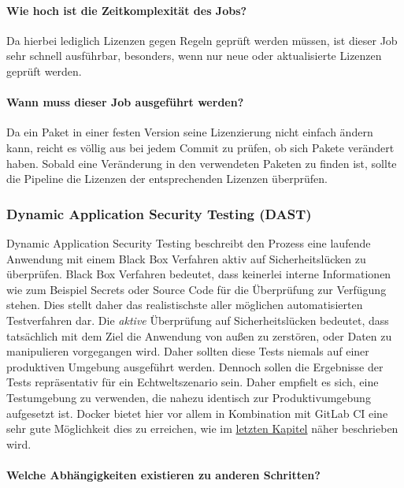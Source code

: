 \paragraph{Wie hoch ist die Zeitkomplexität des Jobs?}

Da hierbei lediglich Lizenzen gegen Regeln geprüft werden müssen, ist dieser Job sehr schnell ausführbar, besonders, wenn nur neue oder aktualisierte Lizenzen geprüft werden.

\paragraph{Wann muss dieser Job ausgeführt werden?}

Da ein Paket in einer festen Version seine Lizenzierung nicht einfach ändern kann, reicht es völlig aus bei jedem Commit zu prüfen, ob sich Pakete verändert haben.
Sobald eine Veränderung in den verwendeten Paketen zu finden ist, sollte die Pipeline die Lizenzen der entsprechenden Lizenzen überprüfen.

\subsubsection{Dynamic Application Security Testing (DAST)}\label{subsubsec:dast}

Dynamic Application Security Testing beschreibt den Prozess eine laufende Anwendung mit einem Black Box Verfahren aktiv auf Sicherheitslücken zu überprüfen.
Black Box Verfahren bedeutet, dass keinerlei interne Informationen wie zum Beispiel Secrets oder Source Code für die Überprüfung zur Verfügung stehen.
Dies stellt daher das realistischste aller möglichen automatisierten Testverfahren dar.
Die \textit{aktive} Überprüfung auf Sicherheitslücken bedeutet, dass tatsächlich mit dem Ziel die Anwendung von außen zu zerstören, oder Daten zu manipulieren vorgegangen wird.
Daher sollten diese Tests niemals auf einer produktiven Umgebung ausgeführt werden.
Dennoch sollen die Ergebnisse der Tests repräsentativ für ein Echtweltszenario sein.
Daher empfielt es sich, eine Testumgebung zu verwenden, die nahezu identisch zur Produktivumgebung aufgesetzt ist.
Docker bietet hier vor allem in Kombination mit GitLab CI eine sehr gute Möglichkeit dies zu erreichen, wie im \hyperref[sec:gitlab-ci-im-einsatz-als-dast-tool]{letzten Kapitel} näher beschrieben wird.

\paragraph{Welche Abhängigkeiten existieren zu anderen Schritten?}

